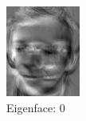 \documentclass[12pt]{article}
\begin{document}
\begin{figure}
	\centering
	\begin{subfigure}[b]{0.20\textwidth}
		\includegraphics[width=\textwidth]{Task4.3_Images/PrincipalComponent0.jpg}
		\caption{Eigenface: 0}
	\end{subfigure}\quad
	\begin{subfigure}[b]{0.20\textwidth}

\end{subfigure}
\end{figure}
\end{document}
